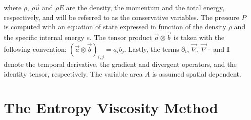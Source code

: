 \documentclass[preprint,10pt]{elsarticle}
\renewcommand{\div}{\vec{\nabla}\! \cdot \!}
\newcommand{\grad}{\vec{\nabla}}
\begin{document}
where $\rho$, $\rho \vec{u}$ and $\rho E$ are the density, the momentum and the total energy, respectively, and will be referred to as the conservative variables. The pressure $P$ is computed with an equation of state expressed in function of the density $\rho$ and the specific internal energy $e$. The tensor product $\vec{a} \otimes \vec{b}$ is taken with the following convention: $(\vec{a} \otimes \vec{b})_{i,j} = a_i b_j$. Lastly, the terms $\partial_t$, $\grad$, $\div$ and $\mathbf{I}$ denote the temporal derivative, the gradient and divergent operators, and the identity tensor, respectively. The variable area $A$ is assumed spatial dependent.
\section{The Entropy Viscosity Method} \label{sec:entro_visc}
\end{document}
